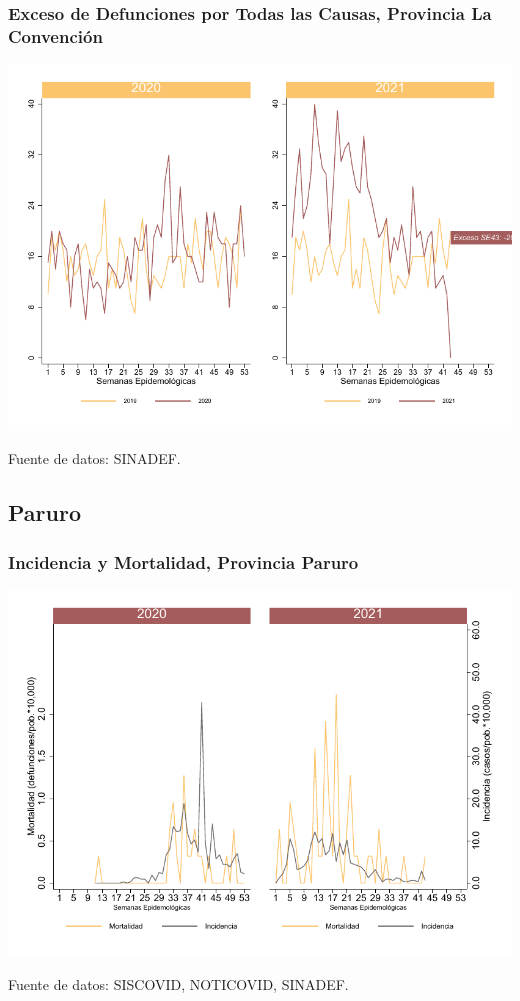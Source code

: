 \documentclass[xcolor=table]{beamer}
\begin{document}
\begin{frame}
	\frametitle{Exceso de Defunciones por Todas las Causas, Provincia La Convención}
	\vspace{-.5cm}
	\begin{center}
		\includegraphics[width=0.8\linewidth, trim={0cm .5cm 0cm 0.2cm},clip]{../figuras/exceso_9.pdf}
	\end{center}
	{\tiny Fuente de datos: SINADEF.}
	
	\hyperlink{indicadores_provinciales}{}
\end{frame}

\subsection{Paruro}

\begin{frame}[label=Paruro]
	\frametitle{Incidencia y Mortalidad, Provincia Paruro}
	\vspace{-.5cm}
	\begin{center}
		\includegraphics[width=0.8\linewidth, trim={0cm .5cm 0cm 0.2cm},clip]{../figuras/incidencia_mortalidad_20_21_10.pdf}
	\end{center}
	{\tiny Fuente de datos: SISCOVID, NOTICOVID, SINADEF.}
\end{frame}
\end{document}
